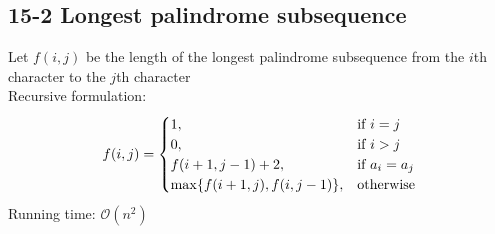 \subsection*{15-2 Longest palindrome subsequence}
\noindent Let $f(i, j)$ be the length of the longest palindrome subsequence from the $i$th character to the $j$th character \\
Recursive formulation:
\begin{equation} \notag
	f(i, j) = \begin{cases}
		1,	& \mbox{if } i = j \\
		0,	& \mbox{if } i > j \\
		f(i + 1, j - 1) + 2,	& \mbox{if } a_i = a_j \\
		\max\{f(i + 1, j), f(i, j - 1)\},	& \mbox{otherwise} \\
	\end{cases}
\end{equation}
Running time: $\mathcal{O}(n^2)$

